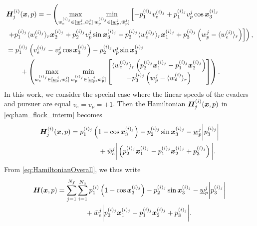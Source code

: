 \begin{align}
\begin{split}
&\bm{H}^{(i)}_j(\state, p)=- \left(\max_{w_e^{(i)_j} \in [\underline{w}_e^j, \bar{w}_e^j]}  \min_{w_p^{(i)_j}  \in [\underline{w}_p^{j}, \bar{w}_p^j]}  
\left[
-p_1^{(i)_j} v_e^{(i)_j} + p_1^{(i)_j} v_p^{j} \cos \state_3^{(i)_j} 
\right. \right.  \\ 
%
& \left. \left. +  p_1^{(i)_j}\langle w_e^{(i)_j} \rangle_r \state_2^{(i)_j} 
%
+ p_2^{(i)_j} v_p^{j} \sin \state_3^{(i)_j} - p_2^{(i)_j} \langle w_e^{(i)_j} \rangle_r  \state_1^{(i)_j} 
%
+ p_3^{(i)_j}\left(w_p^j - \langle w_e^{(i)} \rangle_r\right)
\right] 
%
\right),
\\
%
&=p_1^{(i)_j} \left(v_e^{(i)_j} - v_p^{j} \cos \state_3^{(i)_j}\right) -  p_2^{(i)_j} v_p^{j} \sin \state_3^{(i)_j}  \\
%
& \qquad + \left(		
\max_{w_e^{(i)_j} \in [\underline{w}_e^j, \bar{w}_e^j]}  \min_{w_p^{(i)_j}  \in [\underline{w}_p^{j}, \bar{w}_p^j]} \begin{bmatrix}
\langle w_e^{(i)_j}\rangle_r \left(p_2^{(i)_j} \state_1^{(i)_j} - p_1^{(i)_j}  \state_2^{(i)_j} \right) 
% 
\\ 
- p_3^{(i)_j} \left(w_p^j - \langle w_e^{(i)}\rangle_r\right)
\end{bmatrix}
\right).
\end{split}
%
\label{eq:ham_flock_interm}
\end{align}
%
In this work, we consider the special case where the linear speeds of the evaders and pursuer are equal \ie $v_e = v_p = +1$.  Then the Hamiltonian $\bm{H}^{(i)}_j(\bm{x}, p)$ in \eqref{eq:ham_flock_interm} becomes 
%
\begin{align}
\bm{H}^{(i)}_j(\bm{x}, p) &= p_1^{(i)_j} \left(1 - \cos \bm{x}_3^{(i)_j}\right) - p_2^{(i)_j} \sin \bm{x}_3^{(i)_j} - \underline{w}_p^j \bigg|p_3^{(i)_j}\bigg| \nonumber 	\\
& \qquad\qquad  
 + \bar{w}_e^j \bigg|\left(p_2^{(i)_j} \bm{x}_1^{(i)_j} - p_1^{(i)_j}\bm{x}_2^{(i)_j} + p_3^{(i)_j}\right)\bigg|  .
\end{align}
%
From \eqref{eq:HamiltonianOverall}, we thus write
%
\begin{align}
\bm{H}(\state, p) &= \sum_{j=1}^{N_f} \sum_{i=1}^{N_a} p_1^{(i)} \left(1 - \cos \state_3^{(i)_j}\right) - p_2^{(i)_j} \sin \state_3^{(i)_j} - \underline{w}_p^j \bigg|p_3^{(i)_j}\bigg|  \nonumber 	\\
& \qquad\qquad %
+ \bar{w}_e^j \bigg| p_2^{(i)_j} \state_1^{(i)_j} - p_1^{(i)_j}\state_2^{(i)_j} + p_3^{(i)_j}\bigg|.
\label{eq:HamiltonianCompletada}
\end{align}
%